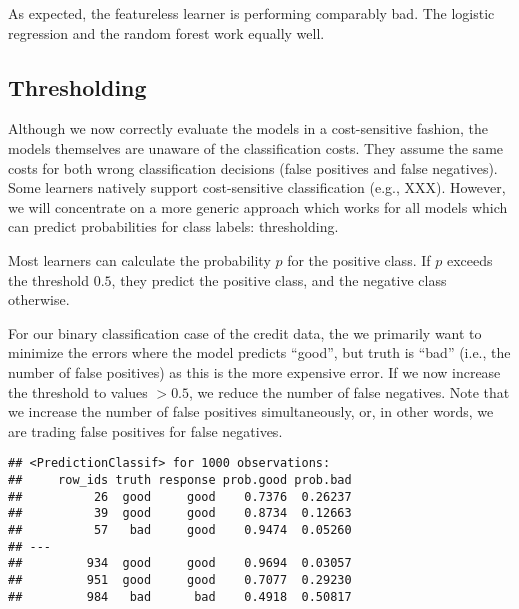\documentclass[
]{scrbook}
\newenvironment{Shaded}{\begin{snugshade}}{\end{snugshade}}
\newcommand{\AttributeTok}[1]{\textcolor[rgb]{0.77,0.63,0.00}{#1}}
\newcommand{\CommentTok}[1]{\textcolor[rgb]{0.56,0.35,0.01}{\textit{#1}}}
\newcommand{\FunctionTok}[1]{\textcolor[rgb]{0.00,0.00,0.00}{#1}}
\newcommand{\NormalTok}[1]{#1}
\newcommand{\OtherTok}[1]{\textcolor[rgb]{0.56,0.35,0.01}{#1}}
\newcommand{\SpecialCharTok}[1]{\textcolor[rgb]{0.00,0.00,0.00}{#1}}
\newcommand{\StringTok}[1]{\textcolor[rgb]{0.31,0.60,0.02}{#1}}
\renewenvironment{Shaded} {\begin{snugshade}\small} {\end{snugshade}}
\begin{document}
As expected, the featureless learner is performing comparably bad.
The logistic regression and the random forest work equally well.

\hypertarget{thresholding-1}{%
\subsection{Thresholding}\label{thresholding-1}}

Although we now correctly evaluate the models in a cost-sensitive fashion, the models themselves are unaware of the classification costs.
They assume the same costs for both wrong classification decisions (false positives and false negatives).
Some learners natively support cost-sensitive classification (e.g., XXX).
However, we will concentrate on a more generic approach which works for all models which can predict probabilities for class labels: thresholding.

Most learners can calculate the probability \(p\) for the positive class.
If \(p\) exceeds the threshold \(0.5\), they predict the positive class, and the negative class otherwise.

For our binary classification case of the credit data, the we primarily want to minimize the errors where the model predicts ``good'', but truth is ``bad'' (i.e., the number of false positives) as this is the more expensive error.
If we now increase the threshold to values \(> 0.5\), we reduce the number of false negatives.
Note that we increase the number of false positives simultaneously, or, in other words, we are trading false positives for false negatives.

\begin{Shaded}
\end{Shaded}

\begin{verbatim}
## <PredictionClassif> for 1000 observations:
##     row_ids truth response prob.good prob.bad
##          26  good     good    0.7376  0.26237
##          39  good     good    0.8734  0.12663
##          57   bad     good    0.9474  0.05260
## ---                                          
##         934  good     good    0.9694  0.03057
##         951  good     good    0.7077  0.29230
##         984   bad      bad    0.4918  0.50817
\end{verbatim}
\end{document}
